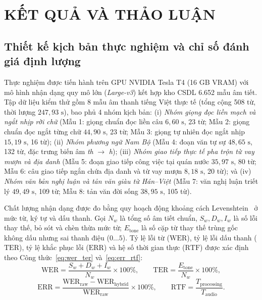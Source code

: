 \documentclass[12pt,a4paper]{article}
\begin{document}
\section{KẾT QUẢ VÀ THẢO LUẬN}

\subsection{Thiết kế kịch bản thực nghiệm và chỉ số đánh giá định lượng}
Thực nghiệm được tiến hành trên GPU NVIDIA Tesla T4 (16 GB VRAM) với mô hình nhận dạng quy mô lớn (\textit{Large-v3}) kết hợp kho CSDL 6.652 mẫu âm tiết. Tập dữ liệu kiểm thử gồm 8 mẫu âm thanh tiếng Việt thực tế (tổng cộng 508 từ, thời lượng $247{,}93\text{ s}$), bao phủ 4 nhóm kịch bản: (i) \textit{Nhóm giọng đọc liền mạch và ngắt nhịp rời chữ} (Mẫu 1: giọng chuẩn đọc liền câu $6{,}60\text{ s}$, 23 từ; Mẫu 2: giọng chuẩn đọc ngắt từng chữ $44{,}90\text{ s}$, 23 từ; Mẫu 3: giọng tự nhiên đọc ngắt nhịp $15{,}19\text{ s}$, 16 từ); (ii) \textit{Nhóm phương ngữ Nam Bộ} (Mẫu 4: đoạn văn tự sự $48{,}65\text{ s}$, 132 từ, đặc trưng biến âm \textit{th} $\to$ \textit{h}); (iii) \textit{Nhóm giao tiếp thực tế pha trộn từ vay mượn và địa danh} (Mẫu 5: đoạn giao tiếp công việc tại quán nước $35{,}97\text{ s}$, 80 từ; Mẫu 6: câu giao tiếp ngắn chứa địa danh và từ vay mượn $8{,}18\text{ s}$, 20 từ); và (iv) \textit{Nhóm văn bản nghị luận và tản văn giàu từ Hán--Việt} (Mẫu 7: văn nghị luận triết lý $49{,}49\text{ s}$, 109 từ; Mẫu 8: tản văn đời sống $38{,}95\text{ s}$, 105 từ).

Chất lượng nhận dạng được đo bằng quy hoạch động khoảng cách Levenshtein~\cite{levenshtein1966} ở mức từ, ký tự và dấu thanh. Gọi $N_w$ là tổng số âm tiết chuẩn, $S_w, D_w, I_w$ là số lỗi thay thế, bỏ sót và chèn thừa mức từ; $E_{\mathrm{tone}}$ là số cặp từ thay thế trùng gốc không dấu nhưng sai thanh điệu ($0\dots 5$). Tỷ lệ lỗi từ ($\mathrm{WER}$), tỷ lệ lỗi dấu thanh ($\mathrm{TER}$), tỷ lệ khắc phục lỗi ($\mathrm{ERR}$) và hệ số thời gian thực ($\mathrm{RTF}$) được xác định theo Công thức~\eqref{eq:wer_ter} và~\eqref{eq:err_rtf}:
\begin{equation}
\mathrm{WER} = \frac{S_w + D_w + I_w}{N_w} \times 100\%, \qquad \mathrm{TER} = \frac{E_{\mathrm{tone}}}{N_w} \times 100\%,
\label{eq:wer_ter}
\end{equation}
\begin{equation}
\mathrm{ERR} = \frac{\mathrm{WER}_{\mathrm{raw}} - \mathrm{WER}_{\mathrm{hybrid}}}{\mathrm{WER}_{\mathrm{raw}}} \times 100\%, \qquad \mathrm{RTF} = \frac{T_{\mathrm{processing}}}{T_{\mathrm{audio}}}.
\label{eq:err_rtf}
\end{equation}
\end{document}
